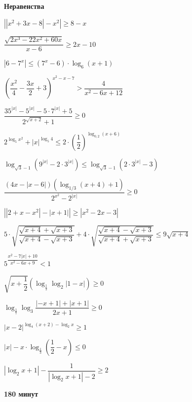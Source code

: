 \centerline{\bf \Huge Неравенства}

 $\left|\left|x^2+3 x-8\right|-x^2\right| \geqslant 8-x$

 $\dfrac{\sqrt{2 x^3-22 x^2+60 x}}{x-6} \geqslant 2 x-10$

 $\left|6-7^x\right| \leqslant\left(7^x-6\right) \cdot \log _6(x+1)$

 $\left(\dfrac{x^2}{4}-\dfrac{3 x}{2}+3\right)^{x^2-x-7}>\dfrac{4}{x^2-6 x+12}$

 $\dfrac{35^{|x|}-5^{|x|}-5 \cdot 7^{|x|}+5}{2^{\sqrt{x+2}}+1} \geqslant 0$

 $2^{\log _5 x^2}+|x|^{\log _5 4} \leqslant 2 \cdot\left(\dfrac{1}{2}\right)^{\log _{0,2}(x+6)}$

 $\log _{\sqrt{3}-1}\left(9^{|x|}-2 \cdot 3^{|x|}\right) \leqslant \log _{\sqrt{3}-1}\left(2 \cdot 3^{|x|}-3\right)$

 $\dfrac{(4 x-|x-6|)\left(\log _{1 / 3}(x+4)+1\right)}{2^{x^2}-2^{|x|}} \geqslant 0$

 $\left|\left|2+x-x^2\right|-|x+1|\right| \geqslant\left|x^2-2 x-3\right|$

 $5 \cdot \sqrt{\dfrac{\sqrt{x+4}+\sqrt{x+3}}{\sqrt{x+4}-\sqrt{x+3}}}+4 \cdot \sqrt{\dfrac{\sqrt{x+4}-\sqrt{x+3}}{\sqrt{x+4}+\sqrt{x+3}}} \leqslant 9 \sqrt{x+4}$

 $5^{\dfrac{x^2-7|x|+10}{x^2-6 x+9}}<1$

 $\sqrt{x+\dfrac{1}{2}}\left(\log _{\frac{1}{2}} \log _2|1-x|\right) \geqslant 0$

 $\log _{\frac{1}{7}} \log _3 \dfrac{|-x+1|+|x+1|}{2 x+1} \geqslant 0$

 $|x-2|^{\log _4(x+2)-\log _2 x} \geqslant 1$

 $|x|-x \cdot \log _{\frac{1}{3}}\left(\dfrac{1}{2}-x\right) \leqslant 0$

 $\left|\log _2 x+1\right|-\dfrac{1}{\left|\log _2 x+1\right|-2} \geqslant 2$\\

\centerline{\textbf{180 минут}}